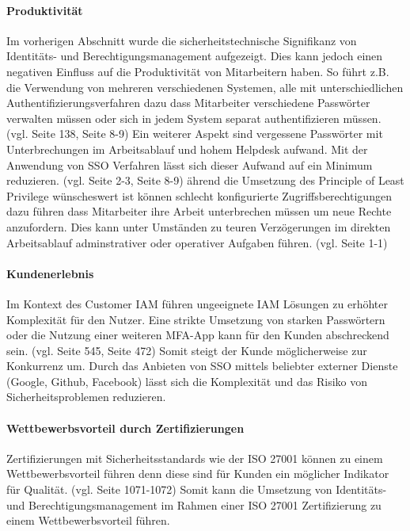 \documentclass[11pt]{article}
\begin{document}
\paragraph{Produktivität}
Im vorherigen Abschnitt wurde die sicherheitstechnische Signifikanz von Identitäts- und Berechtigungsmanagement aufgezeigt. Dies kann jedoch einen negativen Einfluss auf die Produktivität von Mitarbeitern haben. So führt z.B. die Verwendung von mehreren verschiedenen Systemen, alle mit unterschiedlichen Authentifizierungsverfahren dazu dass Mitarbeiter verschiedene Passwörter verwalten müssen oder sich in jedem System separat authentifizieren müssen. (vgl. \cite{radha2012survey} Seite 138, \cite{haag2012selecting} Seite 8-9) Ein weiterer Aspekt sind vergessene Passwörter mit Unterbrechungen im Arbeitsablauf und hohem Helpdesk aufwand. Mit der Anwendung von SSO Verfahren lässt sich dieser Aufwand auf ein Minimum reduzieren. (vgl. \cite{thakur2015user} Seite 2-3, \cite{haag2012selecting} Seite 8-9) ährend die Umsetzung des Principle of Least Privilege wünscheswert ist können schlecht konfigurierte Zugriffsberechtigungen dazu führen dass Mitarbeiter ihre Arbeit unterbrechen müssen um neue Rechte anzufordern. Dies kann unter Umständen zu teuren Verzögerungen im direkten Arbeitsablauf adminstrativer oder operativer Aufgaben führen. (vgl. \cite{weishaupl2015towards} Seite 1-1)
\paragraph{Kundenerlebnis}
Im Kontext des Customer IAM führen ungeeignete IAM Lösungen zu erhöhter Komplexität für den Nutzer. Eine strikte Umsetzung von starken Passwörtern oder die Nutzung einer weiteren MFA-App kann für den Kunden abschreckend sein. (vgl. \cite{azhar2014economics} Seite 545, \cite{liveretos2022customer} Seite 472) Somit steigt der Kunde möglicherweise zur Konkurrenz um. Durch das Anbieten von SSO mittels beliebter externer Dienste (Google, Github, Facebook) lässt sich die Komplexität und das Risiko von Sicherheitsproblemen reduzieren.
\paragraph{Wettbewerbsvorteil durch Zertifizierungen}
Zertifizierungen mit Sicherheitsstandards wie der ISO 27001 können zu einem Wettbewerbsvorteil führen denn diese sind für Kunden ein möglicher Indikator für Qualität. (vgl. \cite{dobrin2015quality} Seite 1071-1072) Somit kann die Umsetzung von Identitäts- und Berechtigungsmanagement im Rahmen einer ISO 27001 Zertifizierung zu einem Wettbewerbsvorteil führen.
\end{document}
